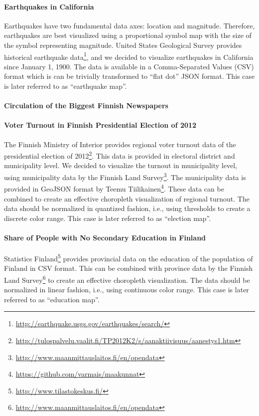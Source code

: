\paragraph{Earthquakes in California}
Earthquakes have two fundamental data axes: location and magnitude. Therefore, earthquakes are best visualized using a proportional symbol map with the size of the symbol representing magnitude. United States Geological Survey provides historical earthquake data\footnote{\url{http://earthquake.usgs.gov/earthquakes/search/}}, and we decided to visualize earthquakes in California since January 1, 1900. The data is available in a Comma-Separated Values (CSV) format which is can be trivially transformed to ``flat dot'' JSON format. This case is later referred to as ``earthquake map''.

\paragraph{Circulation of the Biggest Finnish Newspapers}

\paragraph{Voter Turnout in Finnish Presidential Election of 2012}
The Finnish Ministry of Interior provides regional voter turnout data of the presidential election of 2012\footnote{\url{http://tulospalvelu.vaalit.fi/TP2012K2/s/aanaktiivisuus/aanestys1.htm}}. This data is provided in electoral district and municipality level. We decided to visualize the turnout in municipality level, using municipality data by the Finnish Land Survey\footnote{\url{http://www.maanmittauslaitos.fi/en/opendata}}. The municipality data is provided in GeoJSON format by Teemu Tiilikainen\footnote{\url{https://github.com/varmais/maakunnat}}. These data can be combined to create an effective choropleth visualization of regional turnout. The data should be normalized in quantized fashion, i.e., using thresholds to create a discrete color range. This case is later referred to as ``election map''.

\paragraph{Share of People with No Secondary Education in Finland}
Statistics Finland\footnote{\url{http://www.tilastokeskus.fi/}} provides provincial data on the education of the population of Finland in CSV format. This can be combined with province data by the Finnish Land Survey\footnote{\url{http://www.maanmittauslaitos.fi/en/opendata}} to create an effective choropleth visualization. The data should be normalized in linear fashion, i.e., using continuous color range. This case is later referred to as ``education map''.

